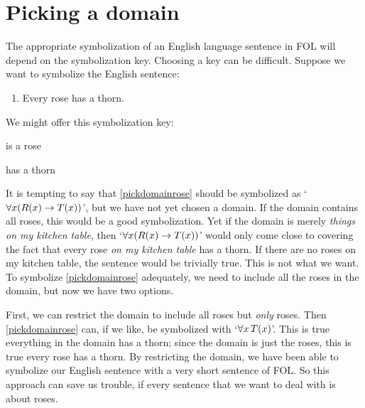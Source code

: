 \section{Picking a domain}
The appropriate symbolization of an English language sentence in FOL will depend on the symbolization key. Choosing a key can be difficult. Suppose we want to symbolize the English sentence:
	\begin{enumerate}
		\item\label{pickdomainrose} Every rose has a thorn.
	\end{enumerate}
We might offer this symbolization key:
	\begin{ekey}
		\item[\atom{R}{x}]  is a rose
		\item[\atom{T}{x}]  has a thorn
	\end{ekey}
It is tempting to say that \cref*{pickdomainrose} should be symbolized as `$\forall x(R(x) \rightarrow T(x))$', but we have not yet chosen a domain. If the domain contains all roses, this would be a good symbolization. Yet if the domain is merely \emph{things on my kitchen table}, then `$\forall x(R(x) \rightarrow T(x))$' would only come close to covering the fact that every rose \emph{on my kitchen table} has a thorn. If there are no roses on my kitchen table, the sentence would be trivially true. This is not what we want. To symbolize \cref*{pickdomainrose} adequately, we need to include all the roses in the domain, but now we have two options.

First, we can restrict the domain to include all roses but \emph{only} roses. Then \cref*{pickdomainrose} can, if we like, be symbolized with `$\forall x\,T(x)$'. This is true \ifeff{} everything in the domain has a thorn; since the domain is just the roses, this is true \ifeff{} every rose has a thorn. By restricting the domain, we have been able to symbolize our English sentence with a very short sentence of FOL. So this approach can save us trouble, if every sentence that we want to deal with is about roses.

